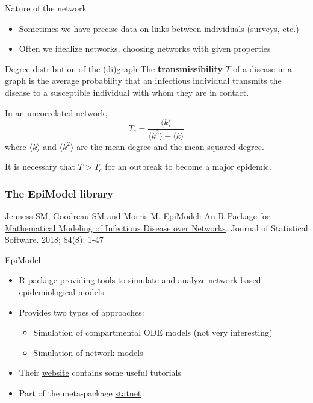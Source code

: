 \documentclass[aspectratio=169]{beamer}\usepackage[]{graphicx}\usepackage[]{xcolor}
\begin{document}
\begin{frame}{Nature of the network}
  \begin{itemize}
    \item Sometimes we have precise data on links between individuals (surveys, etc.)
    \item Often we idealize networks, choosing networks with given properties
  \end{itemize}
\end{frame}

\begin{frame}{Degree distribution of the (di)graph}
  The \textbf{transmissibility} $T$ of a disease in a graph is the average probability that an infectious individual transmits the disease to a susceptible individual with whom they are in contact.
  
  In an uncorrelated network,
  $$
  T_c = \frac{\langle k\rangle}{\langle k^2\rangle-\langle k\rangle}
  $$
  where $\langle k\rangle$ and $\langle k^2\rangle$ are the mean degree and the mean squared degree.
  
  It is necessary that $T>T_c$ for an outbreak to become a major epidemic.
\end{frame}

\begin{frame}
\frametitle{The EpiModel library}
Jenness SM, Goodreau SM and Morris M. 
\href{https://doi.org/10.18637/jss.v084.i08}{EpiModel: An R Package for Mathematical Modeling of Infectious Disease over Networks}. 
Journal of Statistical Software. 2018; 84(8): 1-47
\end{frame}

\begin{frame}{EpiModel}
  \begin{itemize}
    \item R package providing tools to simulate and analyze network-based epidemiological models
    \item Provides two types of approaches:
      \begin{itemize}
        \item Simulation of compartmental ODE models (not very interesting)
        \item Simulation of network models
      \end{itemize}
    \item Their \href{https://www.epimodel.org}{website} contains some useful tutorials
    \item Part of the meta-package \href{http://statnet.org/}{statnet}
  \end{itemize}
\end{frame}
\end{document}
